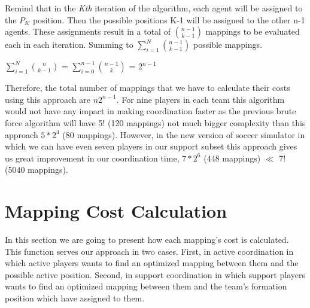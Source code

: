 Remind that in the \textit{Kth} iteration of the algorithm, each agent will be assigned to the $P_{K}$ position. Then the possible positions K-1 will be assigned to the other n-1 agents. These assignments result in a total of $ {{n-1}\choose{k-1}} $ mappings to be evaluated each in each iteration. Summing to $\sum\limits_{i=1}^N{{n-1}\choose{k-1}}$ possible mappings.\\
\begin{center}
$\sum\limits_{i=1}^N{{n}\choose{k-1}}$ = $\sum\limits_{i=0}^{n-1}{{n-1}\choose{k}}$ = $2^{n-1}$
\end{center}
Therefore, the total number of mappings that we have to calculate their costs using this approach are $n2^{n-1}$. For nine players in each team this algorithm would not have any impact in making coordination faster as the previous brute force algorithm will have 5! (120 mappings) not much bigger complexity than this approach $5 \ast 2^{4}$ (80 mappings). However, in the new version of soccer simulator in which we can have even seven players in our support subset this approach gives us great improvement in our coordination time, $7 \ast 2^{6}$ (448 mappings) $\ll$ 7! (5040 mappings).

\section{Mapping Cost Calculation}
In this section we are going to present how each mapping's cost is calculated. This function serves our approach in two cases. First, in active coordination in which active players wants to find an optimized mapping between them and the possible active position. Second, in support coordination in which support players wants to find an optimized mapping between them and the team's formation position which have assigned to them.

